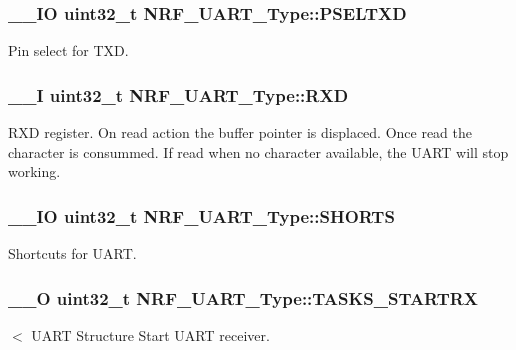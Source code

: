 \subsubsection[{P\+S\+E\+L\+T\+X\+D}]{\setlength{\rightskip}{0pt plus 5cm}\+\_\+\+\_\+\+I\+O uint32\+\_\+t N\+R\+F\+\_\+\+U\+A\+R\+T\+\_\+\+Type\+::\+P\+S\+E\+L\+T\+X\+D}\label{struct_n_r_f___u_a_r_t___type_ac0141eb47b1d90be88be2ea362027c52}
Pin select for T\+X\+D. \hypertarget{struct_n_r_f___u_a_r_t___type_a6cbf8161d52614c32ffc068b09870fb5}{}
\subsubsection[{R\+X\+D}]{\setlength{\rightskip}{0pt plus 5cm}\+\_\+\+\_\+\+I uint32\+\_\+t N\+R\+F\+\_\+\+U\+A\+R\+T\+\_\+\+Type\+::\+R\+X\+D}\label{struct_n_r_f___u_a_r_t___type_a6cbf8161d52614c32ffc068b09870fb5}
R\+X\+D register. On read action the buffer pointer is displaced. Once read the character is consummed. If read when no character available, the U\+A\+R\+T will stop working. \hypertarget{struct_n_r_f___u_a_r_t___type_a1a1c1d51ab52e0900717e5694a306456}{}
\subsubsection[{S\+H\+O\+R\+T\+S}]{\setlength{\rightskip}{0pt plus 5cm}\+\_\+\+\_\+\+I\+O uint32\+\_\+t N\+R\+F\+\_\+\+U\+A\+R\+T\+\_\+\+Type\+::\+S\+H\+O\+R\+T\+S}\label{struct_n_r_f___u_a_r_t___type_a1a1c1d51ab52e0900717e5694a306456}
Shortcuts for U\+A\+R\+T. \hypertarget{struct_n_r_f___u_a_r_t___type_ac3c706bf6982970135b90cffbb292843}{}
\subsubsection[{T\+A\+S\+K\+S\+\_\+\+S\+T\+A\+R\+T\+R\+X}]{\setlength{\rightskip}{0pt plus 5cm}\+\_\+\+\_\+\+O uint32\+\_\+t N\+R\+F\+\_\+\+U\+A\+R\+T\+\_\+\+Type\+::\+T\+A\+S\+K\+S\+\_\+\+S\+T\+A\+R\+T\+R\+X}\label{struct_n_r_f___u_a_r_t___type_ac3c706bf6982970135b90cffbb292843}
$<$ U\+A\+R\+T Structure Start U\+A\+R\+T receiver. \hypertarget{struct_n_r_f___u_a_r_t___type_a488d441dbbe1556b761f2afb3406648d}{}
